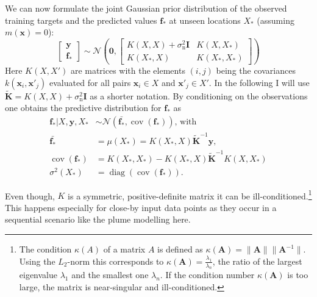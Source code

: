 \documentclass[11pt,a4paper]{scrreprt}
\newcommand{\vc}[1]{\bm{#1}}
\newcommand{\mat}[1]{\bm{#1}}
\DeclareMathOperator{\cov}{cov}
\DeclareMathOperator{\diag}{diag}
\begin{document}
We can now formulate the joint Gaussian prior distribution of the observed 
training targets and the predicted values $\vc f_*$ at unseen locations $X_*$ 
(assuming $m(\vc x) = 0$):
\begin{equation}
    \left[ \begin{array}{c}\vc y \\ \vc f_* \end{array} \right]
    \sim \mathcal{N}\left(\vc 0,
        \left[ \begin{array}{cc}
            K(X, X) + \sigma_{\text{n}}^2 \mat I & K(X, X_*) \\ K(X_*, X) 
            & K(X_*, X_*)
        \end{array} \right]
    \right)
\end{equation}
Here $K(X, X')$ are matrices with the elements $(i, j)$ being the covariances 
$k(\vc x_i, \vc x'_j)$ evaluated for all pairs $\vc x_i \in X$ and $\vc x'_j \in 
X'$. In the following I will use $\tilde{\mat K} = K(X, X) + \sigma_{\text{n}}^2 
\mat I$ as a shorter notation. By conditioning on the observations one obtains 
the predictive distribution for $\vc f_*$ as
\begin{align}
    \vc f_* | X, \vc y, X_* &\sim \mathcal{N}(\bar{\vc f_*}, \cov(\vc 
    f_*))\text{, with}\\
    \bar{\vc f_*} &= \mu(X_*) = K(X_*, X)\tilde{\mat K}^{-1} \vc y\text{,} \\
    \cov(\vc f_*) &= K(X_*, X_*) - K(X_*, X)\tilde{\mat K}^{-1}K(X, X_*) 
    \\
    \sigma^2(X_*) &= \diag(\cov(\vc f_*)) \text{.}
\end{align}

Even though, $K$ is a symmetric, positive-definite matrix it can be 
ill-conditioned.\footnote{The condition $\kappa(A)$ of a matrix $A$ is defined 
    as $\kappa(\mat A) = \|\mat A\| \|\mat A^{-1}\|$. Using the $L_2$-norm this 
    corresponds to $\kappa(\mat A) = \frac{\lambda_1}{\lambda_n}$,
    the ratio of the largest eigenvalue $\lambda_1$ and the smallest one
    $\lambda_n$. If the condition number $\kappa(\mat A)$ is too large, the 
    matrix is near-singular and ill-conditioned.} This happens especially for 
close-by input data points as they occur in a sequential scenario like the plume 
modelling here.
\end{document}
